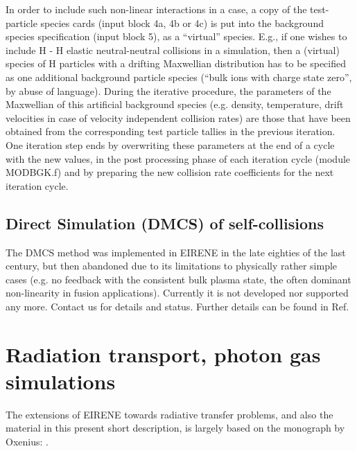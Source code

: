 In order to include such non-linear interactions in a case, a copy of
the test-particle species cards (input block 4a, 4b or 4c) is put into
the background species specification (input block 5), as a ``virtual'' species.
E.g., if one
wishes to include H - H elastic neutral-neutral collisions in a
simulation, then a (virtual) species of H particles with a drifting Maxwellian distribution has to be
specified as one additional background particle species (``bulk ions with charge
state zero'', by abuse of language). During the
iterative
procedure, the parameters of the Maxwellian of this artificial background species
(e.g. density, temperature, drift velocities in case of velocity independent collision rates)
are those that have been
obtained from the corresponding test particle tallies in the previous
iteration. One iteration step ends by overwriting these parameters
at the end of a cycle with the new values, in the post processing phase
of each iteration cycle (module MODBGK.f) and by preparing the new collision rate coefficients
for the next iteration cycle.



\subsection{Direct Simulation (DMCS) of self-collisions}
The DMCS method was implemented in EIRENE in the late eighties of the last century,
but then abandoned due to its limitations to physically rather simple cases (e.g. no feedback
with the consistent bulk plasma state, the often dominant non-linearity in fusion applications).
Currently it is not developed nor supported  any more. Contact us for details and
status. Further details can be found in Ref. \cite{kn:Behringer}

\section{Radiation transport, photon gas simulations}
The extensions of EIRENE towards radiative transfer problems, and also the material in this
present short description, is largely based on the monograph by Oxenius: \cite{kn:Oxenius}.

